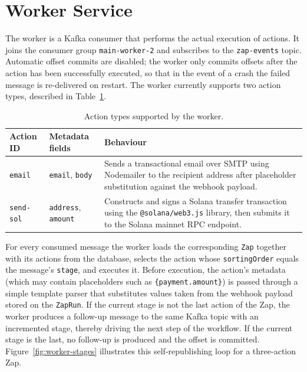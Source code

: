 \section{Worker Service}

The worker is a Kafka consumer that performs the actual execution of actions. It joins the consumer group \texttt{main-worker-2} and subscribes to the \texttt{zap-events} topic. Automatic offset commits are disabled; the worker only commits offsets after the action has been successfully executed, so that in the event of a crash the failed message is re-delivered on restart. The worker currently supports two action types, described in Table~\ref{tab:actions}.

\begin{table}[h]
\centering
\caption{Action types supported by the worker.}
\label{tab:actions}
\renewcommand{\arraystretch}{1.3}
\begin{tabular}{|l|p{4.5cm}|p{7cm}|}
\hline
\textbf{Action ID} & \textbf{Metadata fields} & \textbf{Behaviour} \\ \hline
\texttt{email} & \texttt{email}, \texttt{body} & Sends a transactional email over SMTP using Nodemailer to the recipient address after placeholder substitution against the webhook payload. \\ \hline
\texttt{send-sol} & \texttt{address}, \texttt{amount} & Constructs and signs a Solana transfer transaction using the \texttt{@solana/web3.js} library, then submits it to the Solana mainnet RPC endpoint. \\ \hline
\end{tabular}
\end{table}

For every consumed message the worker loads the corresponding \texttt{Zap} together with its actions from the database, selects the action whose \texttt{sortingOrder} equals the message's \texttt{stage}, and executes it. Before execution, the action's metadata (which may contain placeholders such as \texttt{\{payment.amount\}}) is passed through a simple template parser that substitutes values taken from the webhook payload stored on the \texttt{ZapRun}. If the current stage is not the last action of the Zap, the worker produces a follow-up message to the same Kafka topic with an incremented stage, thereby driving the next step of the workflow. If the current stage is the last, no follow-up is produced and the offset is committed. Figure~\ref{fig:worker-stages} illustrates this self-republishing loop for a three-action Zap.

